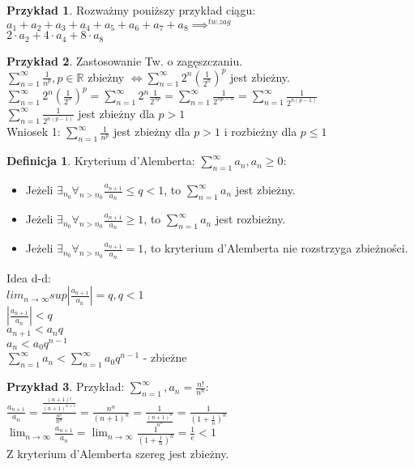 \documentclass{article}
\theoremstyle{definition}
\newtheorem{de}{Definicja}[subsection]
\theoremstyle{definition}
\theoremstyle{definition}
\newtheorem{pk}{Przykład}[subsection]
\theoremstyle{definition}
\begin{document}
\begin{pk}
    Rozważmy poniższy przykład ciągu:\\
    $a_1+a_2+a_3+a_4+a_5+a_6+a_7+a_8 \implies^{tw. zag} $\\
    $2\cdot a_2 + 4\cdot a_4 + 8\cdot a_8$
\end{pk}

\begin{pk}
    Zastosowanie Tw. o zagęszczaniu.\\
    $\sum_{n=1}^{\infty} \frac{1}{n^p}, p\in\mathbb{R}$ zbieżny $\iff \sum_{n=1}^{\infty} 2^n (\frac{1}{2^n})^p$ jest zbieżny.\\
    $\sum_{n=1}^{\infty} 2^n (\frac{1}{2^n})^p = \sum_{n=1}^{\infty} 2^n \frac{1}{2^{np}} = \sum_{n=1}^{\infty} \frac{1}{2^{np-n}} = \sum_{n=1}^{\infty} \frac{1}{2^{n(p-1)}}$\\
    $\sum_{n=1}^{\infty} \frac{1}{2^{n(p-1)}}$ jest zbieżny dla $p>1$\\
    Wniosek 1: $\sum_{n=1}^{\infty} \frac{1}{n^p}$ jest zbieżny dla $p>1$ i rozbieżny dla $p\leq 1$\\
\end{pk}

\begin{de}
    Kryterium d'Alemberta:
    $\sum_{n=1}^{\infty} a_n, a_n\geq 0$:
    \begin{itemize}
        \item Jeżeli $\exists_{n_0}\forall_{n>n_0} \frac{a_{n+1}}{a_n} \leq q < 1$, to $\sum_{n=1}^{\infty} a_n$ jest zbieżny.
        \item Jeżeli $\exists_{n_0}\forall_{n>n_0} \frac{a_{n+1}}{a_n} \geq 1$, to $\sum_{n=1}^{\infty} a_n$ jest rozbieżny.
        \item Jeżeli $\exists_{n_0}\forall_{n>n_0} \frac{a_{n+1}}{a_n} = 1$, to kryterium d'Alemberta nie rozstrzyga zbieżności.
    \end{itemize}
    Idea d-d: \\
    $lim_{n\rightarrow \infty} sup |\frac{a_{n+1}}{a_n}| = q, q < 1$\\
    $|\frac{a_{n+1}}{a_n}|<q$\\
    $a_{n+1} < a_n q$\\
    $a_n < a_0 q^{n-1}$\\
    $\sum_{n=1}^{\infty} a_n < \sum_{n=1}^{\infty} a_0 q^{n-1}$ - zbieżne
\end{de}

\begin{pk}
    Przykład: $\sum_{n=1}^{\infty}, a_n=\frac{n!}{n^n}$:\\
    $\frac{a_{n+1}}{a_n}=\frac{\frac{(n+1)!}{(n+1)^{n+1}}}{\frac{n!}{n^n}}=\frac{n^n}{(n+1)^n}=\frac{1}{\frac{(n+1)^n}{n^n}}=\frac{1}{(1+\frac{1}{n})^n}$\\
    $\lim_{n\rightarrow \infty} \frac{a_{n+1}}{a_n} = \lim_{n\rightarrow\infty} \frac{1}{(1+\frac{1}{n})^n}=\frac{1}{e}<1$\\
    Z kryterium d'Alemberta szereg jest zbieżny.
\end{pk}
\end{document}
